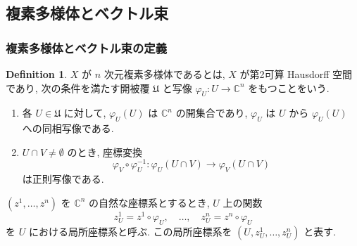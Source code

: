 \documentclass[dvipdfmx,a4paper,11pt]{article} %
\theoremstyle{definition}
\newtheorem{defn}[thm]{Definition}
\theoremstyle{remark}
\numberwithin{equation}{section}
\begin{document}
\subsection{複素多様体とベクトル束}
\label{subsec-cpx-vectorbdl}
\subsubsection{複素多様体とベクトル束の定義}
\begin{defn}
\(X\) が \(n\) 次元複素多様体であるとは, \(X\) が第2可算 Hausdorff 空間であり, 次の条件を満たす開被覆 \(\mathfrak{U}\) と写像 \(\varphi_U \colon U \longrightarrow \mathbb{C}^n\) をもつことをいう.
\begin{enumerate}
\item[(a)] 各 \(U\in\mathfrak{U}\) に対して, \(\varphi_U(U)\) は \(\mathbb{C}^n\) の開集合であり, \(\varphi_U\) は \(U\) から \(\varphi_U(U)\) への同相写像である.
\item[(b)] \(U \cap V\neq \emptyset\) のとき, 座標変換
\[
\varphi_V \circ \varphi_U^{-1} \colon \varphi_U(U \cap V) \longrightarrow \varphi_V(U \cap V)
\]
は正則写像である.
\end{enumerate}
\((z^1,\ldots,z^n)\) を \(\mathbb{C}^n\) の自然な座標系とするとき, \(U\) 上の関数
\[
z_U^1=z^1\circ \varphi_U,\quad \ldots,\quad z_U^n=z^n\circ \varphi_U
\]
を \(U\) における局所座標系と呼ぶ. この局所座標系を \((U,z_U^1,\ldots,z_U^n)\) と表す.
\end{defn}
\end{document}
